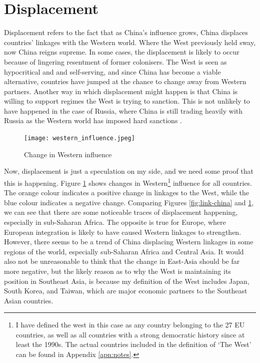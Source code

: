 \section{Displacement}
Displacement refers to the fact that as China's influence grows, China displaces countries' linkages with the Western world. Where the West previously held sway, now China reigns supreme. In some cases, the displacement is likely to occur because of lingering resentment of former colonisers. The West is seen as hypocritical and and self-serving, and since China has become a viable alternative, countries have jumped at the chance to change away from Western partners. Another way in which displacement might happen is that China is willing to support regimes the West is trying to sanction. This is not unlikely to have happened in the case of Russia, where China is still trading heavily with Russia as the Western world has imposed hard sanctions \citep{beijing_newsroom_china-russia_2025}.

\begin{figure}[hbt!]
\centering
\texttt{[image: western\_influence.jpeg]}
\caption{Change in Western influence}
\label{fig:west}
\end{figure}

Now, displacement is just a speculation on my side, and we need some proof that this is happening. Figure \ref{fig:west} shows changes in Western\footnote{I have defined the west in this case as any country belonging to the 27 EU countries, as well as all countries with a strong democratic history since at least the 1990s. The actual countries included in the definition of `The West' can be found in Appendix \ref{apn:notes}.} influence for all countries. The orange colour indicates a positive change in linkages to the West, while the blue colour indicates a negative change. Comparing Figures \ref{fig:link-china} and \ref{fig:west}, we can see that there are some noticeable traces of displacement happening, especially in sub-Saharan Africa. The opposite is true for Europe, where European integration is likely to have caused Western linkages to strengthen. However, there seems to be a trend of China displacing Western linkages in some regions of the world, especially sub-Saharan Africa and Central Asia. It would also not be unreasonable to think that the change in East-Asia should be far more negative, but the likely reason as to why the West is maintaining its position in Southeast Asia, is because my definition of the West includes Japan, South Korea, and Taiwan, which are major economic partners to the Southeast Asian countries. 

